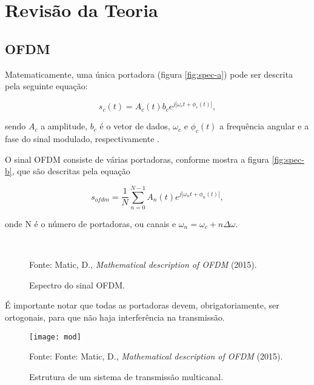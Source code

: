 \newpage
\section{Revisão da Teoria}

\subsection{OFDM}

Matematicamente, uma única portadora (figura \ref{fig:spec-a}) pode ser descrita pela seguinte equação:

\begin{equation}
s_c(t) = A_c(t)b_ce^{j|\omega_c t + \phi_c (t)|},
\end{equation}

sendo $A_c$ a amplitude, $b_c$ é o vetor de dados, $\omega_c$ e  $\phi_c (t)$ a frequência angular e a fase do sinal modulado, respectivamente \cite{Alencar}.

O sinal OFDM consiste de várias portadoras, conforme mostra a figura \ref{fig:spec-b}, que são descritas pela equação 

\begin{equation}
s_{ofdm} = \frac{1}{N} \sum_{n=0}^{N-1}A_n(t)e^{j|\omega_n t + \phi_n (t)|},
\end{equation}

onde N é o número de portadoras, ou canais e $\omega_n = \omega_c + n\Delta\omega$.

\begin{figure}[H]
  \centering
  \caption{Espectro do sinal OFDM.}
  
  \\
  
  
  \small Fonte: Matic, D., \textit{Mathematical description of OFDM} (2015).
\end{figure}

É importante notar que todas as portadoras devem, obrigatoriamente, ser ortogonais, para que não haja interferência na transmissão.

\begin{figure}[H]
  \centering
  \caption{Estrutura de um sistema de transmissão multicanal.}
  \label{fig:tx}
  \texttt{[image: mod]}
  
  \small Fonte: Fonte: Matic, D., \textit{Mathematical description of OFDM} (2015).
\end{figure}

